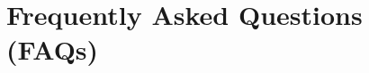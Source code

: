 \newpage
\onecolumn
\section*{Frequently Asked Questions (FAQs)}\label{sec:FAQs}

\begin{enumerate}







\end{enumerate}
